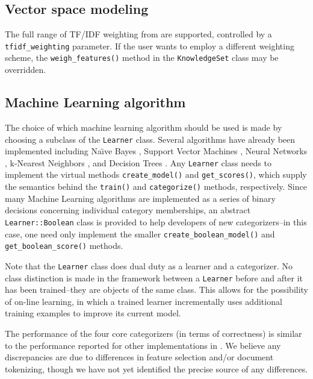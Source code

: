 \documentclass[a4paper,twocolumn]{article}
\begin{document}
\subsection{Vector space modeling}
The full range of TF/IDF weighting from \cite{salton:88} are
supported, controlled by a \texttt{tfidf\_weighting} parameter.  If
the user wants to employ a different weighting scheme, the
\texttt{weigh\_features()} method in the \texttt{KnowledgeSet} class
may be overridden.

\subsection{Machine Learning algorithm}
The choice of which machine learning algorithm should be used is made
by choosing a subclass of the \texttt{Learner} class.  Several
algorithms have already been implemented including Na\"\i ve Bayes
\cite{lewis:98}, Support Vector Machines \cite{scholkopf:99}
\cite{cortes:95}, Neural Networks \cite{calvo:01} \cite{yang:99},
k-Nearest Neighbors \cite{yang:99}, and Decision Trees
\cite{quinlan:89}.  Any \texttt{Learner} class needs to implement the
virtual methods \texttt{create\_model()} and \texttt{get\_scores()},
which supply the semantics behind the \texttt{train()} and
\texttt{categorize()} methods, respectively.  Since many Machine
Learning algorithms are implemented as a series of binary decisions
concerning individual category memberships, an abstract
\texttt{Learner::Boolean} class is provided to help developers of new
categorizers--in this case, one need only implement the smaller
\texttt{create\_boolean\_model()} and \texttt{get\_boolean\_score()}
methods.

Note that the \texttt{Learner} class does dual duty as a learner and a
categorizer.  No class distinction is made in the framework between a
\texttt{Learner} before and after it has been trained--they are
objects of the same class.  This allows for the possibility of on-line
learning, in which a trained learner incrementally uses additional
training examples to improve its current model.

The performance of the four core categorizers (in terms of
correctness) is similar to the performance reported for other
implementations in \cite{yang:99}.  We believe any discrepancies are
due to differences in feature selection and/or document tokenizing,
though we have not yet identified the precise source of any
differences.
\end{document}
